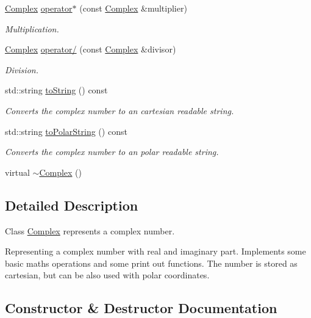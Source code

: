 \begin{DoxyCompactItemize}
\mbox{\hyperlink{class_complex}{Complex}} \mbox{\hyperlink{class_complex_a99935ad84f8b979344d68485c42462c7}{operator$\ast$}} (const \mbox{\hyperlink{class_complex}{Complex}} \&multiplier)
\begin{DoxyCompactList}\small\item\em Multiplication. \end{DoxyCompactList}\item 
\mbox{\hyperlink{class_complex}{Complex}} \mbox{\hyperlink{class_complex_a365fd33e7bc67fde80e79c514aab95bc}{operator/}} (const \mbox{\hyperlink{class_complex}{Complex}} \&divisor)
\begin{DoxyCompactList}\small\item\em Division. \end{DoxyCompactList}\item 
std\+::string \mbox{\hyperlink{class_complex_af125108c8589740c1b9893aaeae8e64b}{to\+String}} () const
\begin{DoxyCompactList}\small\item\em Converts the complex number to an cartesian readable string. \end{DoxyCompactList}\item 
std\+::string \mbox{\hyperlink{class_complex_acbec47c6e4b7538c6f1a1b4234f9cbf7}{to\+Polar\+String}} () const
\begin{DoxyCompactList}\small\item\em Converts the complex number to an polar readable string. \end{DoxyCompactList}\item 
virtual \mbox{\hyperlink{class_complex_a70e14b17c92e3da779686b98f9f3bb2d}{$\sim$\+Complex}} ()
\end{DoxyCompactItemize}


\subsection{Detailed Description}
Class \mbox{\hyperlink{class_complex}{Complex}} represents a complex number. 

Representing a complex number with real and imaginary part. Implements some basic maths operations and some print out functions. The number is stored as cartesian, but can be also used with polar coordinates. 

\subsection{Constructor \& Destructor Documentation}
\mbox{\label{class_complex_a43b9f07cdf697c71b5fd506a6cc80b8f}} 

